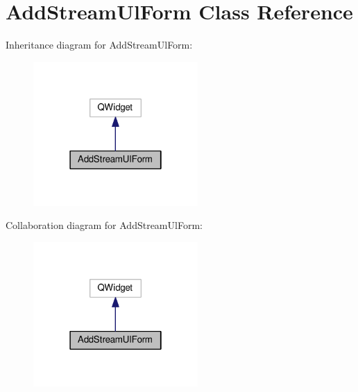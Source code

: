 \hypertarget{class_add_stream_ul_form}{}\section{Add\+Stream\+Ul\+Form Class Reference}
\label{class_add_stream_ul_form}


Inheritance diagram for Add\+Stream\+Ul\+Form\+:
\nopagebreak
\begin{figure}[H]
\begin{center}
\leavevmode
\includegraphics[width=178pt]{class_add_stream_ul_form__inherit__graph}
\end{center}
\end{figure}


Collaboration diagram for Add\+Stream\+Ul\+Form\+:
\nopagebreak
\begin{figure}[H]
\begin{center}
\leavevmode
\includegraphics[width=178pt]{class_add_stream_ul_form__coll__graph}
\end{center}
\end{figure}
